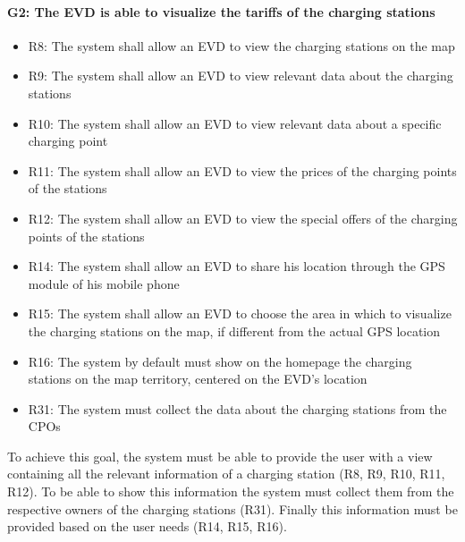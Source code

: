 \paragraph{G2: The EVD is able to visualize the tariffs of the charging stations}
\begin{itemize}
     \item R8: The system shall allow an EVD to view the charging stations on the map
    \item R9: The system shall allow an EVD to view relevant data about the charging stations
    \item R10: The system shall allow an EVD to view relevant data about a specific charging point
    \item R11: The system shall allow an EVD to view the prices of the charging points of the stations
    \item R12: The system shall allow an EVD to view the special offers of the charging points of the stations
    \item R14: The system shall allow an EVD to share his location through the GPS module of his mobile phone
    \item R15: The system shall allow an EVD to choose the area in which to visualize the charging stations on the map, if different from the actual GPS location
    \item R16: The system by default must show on the homepage the charging stations on the map territory, centered on the EVD's location
    \item R31: The system must collect the data about the charging stations from the CPOs
\end{itemize}
To achieve this goal, the system must be able to provide the user with a view containing all the relevant information of a charging station (R8, R9, R10, R11, R12). To be able to show this information the system must collect them from the respective owners of the charging stations (R31). Finally this information must be provided based on the user needs (R14, R15, R16).


